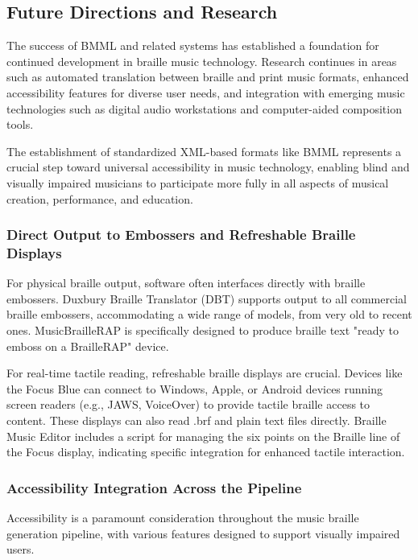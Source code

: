 \subsection{Future Directions and Research}

The success of BMML and related systems has established a foundation for continued development in braille music technology. Research continues in areas such as automated translation between braille and print music formats, enhanced accessibility features for diverse user needs, and integration with emerging music technologies such as digital audio workstations and computer-aided composition tools.

The establishment of standardized XML-based formats like BMML represents a crucial step toward universal accessibility in music technology, enabling blind and visually impaired musicians to participate more fully in all aspects of musical creation, performance, and education.
\subsubsection{Direct Output to Embossers and Refreshable Braille Displays}
For physical braille output, software often interfaces directly with braille embossers. Duxbury Braille Translator (DBT) supports output to all commercial braille embossers, accommodating a wide range of models, from very old to recent ones. \cite{duxbury-dbt} MusicBrailleRAP is specifically designed to produce braille text "ready to emboss on a BrailleRAP" device. \cite{github-braillerap}

For real-time tactile reading, refreshable braille displays are crucial. Devices like the Focus Blue can connect to Windows, Apple, or Android devices running screen readers (e.g., JAWS, VoiceOver) to provide tactile braille access to content. \cite{focus-blue, freedomscientific-jaws} These displays can also read .brf and plain text files directly. \cite{focus-blue} Braille Music Editor includes a script for managing the six points on the Braille line of the Focus display, indicating specific integration for enhanced tactile interaction. \cite{braillemusiceditor}

\subsubsection{Accessibility Integration Across the Pipeline}
Accessibility is a paramount consideration throughout the music braille generation pipeline, with various features designed to support visually impaired users.

